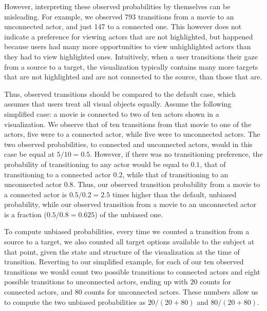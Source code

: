 However, interpreting these observed probabilities by themselves can be misleading. For example, we observed 793 transitions from a movie to an unconnected actor, and just 147 to a connected one. This however does not indicate a preference for viewing actors that are not highlighted, but happened because users had many more opportunities to view unhighlighted actors than they had to view highlighted ones. Intuitively, when a user transitions their gaze from a source to a target, the visualization typically contains many more targets that are not highlighted and are not connected to the source, than those that are. 

Thus, observed transitions should be compared to the default case, which assumes that users treat all visual objects equally. Assume the following simplified case: a movie is connected to two of ten actors shown in a visualization. We observe that of ten transitions from that movie to one of the actors, five were to a connected actor, while five were to unconnected actors. The two observed probabilities, to connected and unconnected actors, would in this case be equal at $5/10 = 0.5$. However, if there was no transitioning preference, the probability of transitioning to any actor would be equal to $0.1$, that of transitioning to a connected actor $0.2$, while that of transitioning to an unconnected actor $0.8$. Thus, our observed transition probability from a movie to a connected actor is $0.5/0.2=2.5$ times higher than the default, unbiased probability, while our observed transition from a movie to an unconnected actor is a fraction ($0.5/0.8=0.625$) of the unbiased one.  

To compute unbiased probabilities, every time we counted a transition from a source to a target, we also counted all target options available to the subject at that point, given the state and structure of the visualization at the time of transition. Reverting to our simplified example, for each of our ten observed transitions we would count two possible transitions to connected actors and eight possible transitions to unconnected actors, ending up with $20$ counts for connected actors, and $80$ counts for unconnected actors. These numbers allow us to compute the two unbiased probabilities as $20/(20+80)$ and $80/(20+80)$.

